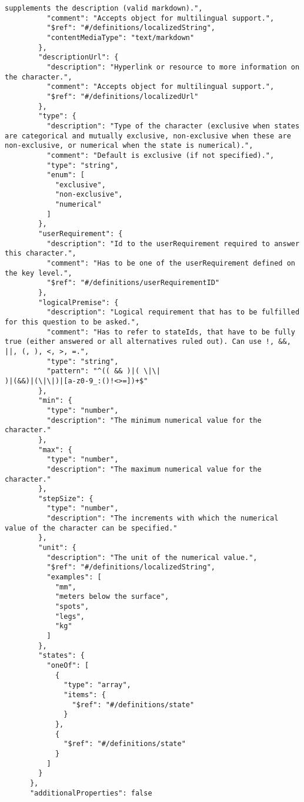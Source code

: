 \documentclass[10pt,letterpaper]{article}
\begin{document}
\begin{verbatim}
supplements the description (valid markdown).",
          "comment": "Accepts object for multilingual support.",
          "$ref": "#/definitions/localizedString",
          "contentMediaType": "text/markdown"
        },
        "descriptionUrl": {
          "description": "Hyperlink or resource to more information on
the character.",
          "comment": "Accepts object for multilingual support.",
          "$ref": "#/definitions/localizedUrl"
        },
        "type": {
          "description": "Type of the character (exclusive when states
are categorical and mutually exclusive, non-exclusive when these are
non-exclusive, or numerical when the state is numerical).",
          "comment": "Default is exclusive (if not specified).",
          "type": "string",
          "enum": [
            "exclusive",
            "non-exclusive",
            "numerical"
          ]
        },
        "userRequirement": {
          "description": "Id to the userRequirement required to answer
this character.",
          "comment": "Has to be one of the userRequirement defined on
the key level.",
          "$ref": "#/definitions/userRequirementID"
        },
        "logicalPremise": {
          "description": "Logical requirement that has to be fulfilled
for this question to be asked.",
          "comment": "Has to refer to stateIds, that have to be fully
true (either answered or all alternatives ruled out). Can use !, &&,
||, (, ), <, >, =.",
          "type": "string",
          "pattern": "^(( && )|( \|\|
)|(&&)|(\|\|)|[a-z0-9_:()!<>=])+$"
        },
        "min": {
          "type": "number",
          "description": "The minimum numerical value for the
character."
        },
        "max": {
          "type": "number",
          "description": "The maximum numerical value for the
character."
        },
        "stepSize": {
          "type": "number",
          "description": "The increments with which the numerical
value of the character can be specified."
        },
        "unit": {
          "description": "The unit of the numerical value.",
          "$ref": "#/definitions/localizedString",
          "examples": [
            "mm",
            "meters below the surface",
            "spots",
            "legs",
            "kg"
          ]
        },
        "states": {
          "oneOf": [
            {
              "type": "array",
              "items": {
                "$ref": "#/definitions/state"
              }
            },
            {
              "$ref": "#/definitions/state"
            }
          ]
        }
      },
      "additionalProperties": false

\end{verbatim}
\end{document}
